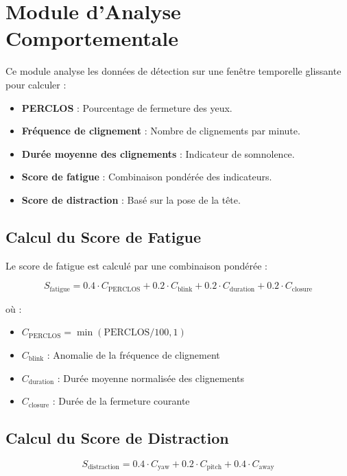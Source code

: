 \documentclass[12pt,a4paper]{report}
\begin{document}
\section{Module d'Analyse Comportementale}

Ce module analyse les données de détection sur une fenêtre temporelle glissante pour calculer :
\begin{itemize}
    \item \textbf{PERCLOS} : Pourcentage de fermeture des yeux.
    \item \textbf{Fréquence de clignement} : Nombre de clignements par minute.
    \item \textbf{Durée moyenne des clignements} : Indicateur de somnolence.
    \item \textbf{Score de fatigue} : Combinaison pondérée des indicateurs.
    \item \textbf{Score de distraction} : Basé sur la pose de la tête.
\end{itemize}

\subsection{Calcul du Score de Fatigue}

Le score de fatigue est calculé par une combinaison pondérée :

\begin{equation}
    S_{\text{fatigue}} = 0.4 \cdot C_{\text{PERCLOS}} + 0.2 \cdot C_{\text{blink}} + 0.2 \cdot C_{\text{duration}} + 0.2 \cdot C_{\text{closure}}
\end{equation}

où :
\begin{itemize}
    \item $C_{\text{PERCLOS}} = \min(\text{PERCLOS}/100, 1)$
    \item $C_{\text{blink}}$ : Anomalie de la fréquence de clignement
    \item $C_{\text{duration}}$ : Durée moyenne normalisée des clignements
    \item $C_{\text{closure}}$ : Durée de la fermeture courante
\end{itemize}

\subsection{Calcul du Score de Distraction}

\begin{equation}
    S_{\text{distraction}} = 0.4 \cdot C_{\text{yaw}} + 0.2 \cdot C_{\text{pitch}} + 0.4 \cdot C_{\text{away}}
\end{equation}
\end{document}
